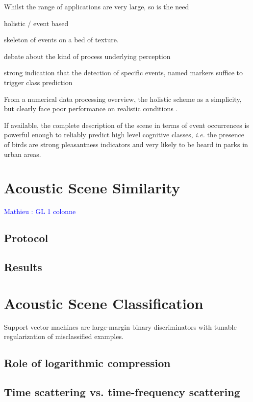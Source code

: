 \documentclass[journal]{IEEEtran}
\makeatletter
\newcommand*{\vs}{vs.\@\xspace}
\newcommand{\ml}[1]{\textcolor{blue}{ Mathieu : #1}}
\makeatother
\begin{document}
Whilst the range of applications are very large, so is the need

holistic / event based

skeleton of events on a bed of texture.

debate about the kind of process underlying perception

strong indication that the detection of specific events, named markers suffice to trigger class prediction

From a numerical data processing overview, the holistic scheme as a simplicity, but clearly face poor performance on realistic conditions \cite{lagrange:hal-01082501}.

If available, the complete description of the scene in terms of event occurrences is powerful enough to reliably predict high level cognitive classes, \textit{i.e.} the presence of birds are strong pleasantness indicators and very likely to be heard in parks in urban areas.

\section{Acoustic Scene Similarity}

\ml{GL 1 colonne}



\subsection{Protocol}

\subsection{Results}

\section{Acoustic Scene Classification}
Support vector machines are large-margin binary discriminators with tunable regularization of misclassified examples.

\subsection{Role of logarithmic compression}

\subsection{Time scattering \vs time-frequency scattering}
\end{document}
